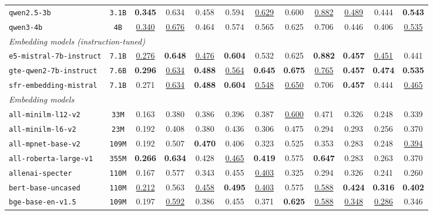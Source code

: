 \documentclass{article}
\begin{document}
\begin{table}[h!]
{\begin{tabular}{lccccccccccc}
\texttt{qwen2.5-3b} & \texttt{3.1B} & \textbf{0.345} & 0.634 & 0.458 & 0.594 & \underline{0.629} & 0.600 & \underline{0.882} & \underline{0.489} & 0.444 & \textbf{0.543} \\
\texttt{qwen3-4b} & \texttt{4B} & \underline{0.340} & \underline{0.676} & 0.464 & 0.574 & 0.565 & 0.625 & 0.706 & 0.446 & 0.406 & \underline{0.535} \\
\midrule
\multicolumn{12}{l}{\textit{Embedding models (instruction-tuned)}} \\
\midrule
\texttt{e5-mistral-7b-instruct} & \texttt{7.1B} & \underline{0.276} & \textbf{0.648} & \underline{0.476} & \textbf{0.604} & 0.532 & 0.625 & \textbf{0.882} & \textbf{0.457} & \underline{0.451} & 0.441 \\
\texttt{gte-qwen2-7b-instruct} & \texttt{7.6B} & \textbf{0.296} & \underline{0.634} & \textbf{0.488} & \underline{0.564} & \textbf{0.645} & \textbf{0.675} & \underline{0.765} & \textbf{0.457} & \textbf{0.474} & \textbf{0.535} \\
\texttt{sfr-embedding-mistral} & \texttt{7.1B} & 0.271 & \underline{0.634} & \textbf{0.488} & \textbf{0.604} & \underline{0.548} & \underline{0.650} & 0.706 & \textbf{0.457} & 0.444 & \underline{0.465} \\
\midrule
\multicolumn{12}{l}{\textit{Embedding models}} \\
\midrule
\texttt{all-minilm-l12-v2} & \texttt{33M} & 0.163 & 0.380 & 0.386 & 0.396 & 0.387 & \underline{0.600} & 0.471 & 0.326 & 0.248 & 0.339 \\
\texttt{all-minilm-l6-v2} & \texttt{23M} & 0.192 & 0.408 & 0.380 & 0.436 & 0.306 & 0.475 & 0.294 & 0.293 & 0.256 & 0.370 \\
\texttt{all-mpnet-base-v2} & \texttt{109M} & 0.192 & 0.507 & \textbf{0.470} & 0.406 & 0.323 & 0.525 & 0.353 & 0.283 & 0.248 & \underline{0.394} \\
\texttt{all-roberta-large-v1} & \texttt{355M} & \textbf{0.266} & \textbf{0.634} & 0.428 & \underline{0.465} & \textbf{0.419} & 0.575 & \textbf{0.647} & 0.283 & 0.263 & 0.370 \\
\texttt{allenai-specter} & \texttt{110M} & 0.167 & 0.577 & 0.343 & 0.455 & \underline{0.403} & 0.325 & 0.294 & 0.326 & 0.241 & 0.260 \\
\texttt{bert-base-uncased} & \texttt{110M} & \underline{0.212} & 0.563 & \underline{0.458} & \textbf{0.495} & \underline{0.403} & 0.575 & \underline{0.588} & \textbf{0.424} & \textbf{0.316} & \textbf{0.402} \\
\texttt{bge-base-en-v1.5} & \texttt{109M} & 0.197 & \underline{0.592} & 0.386 & 0.455 & 0.371 & \textbf{0.625} & \underline{0.588} & \underline{0.348} & \underline{0.286} & 0.346 \\

\end{tabular}}
\end{table}
\end{document}
